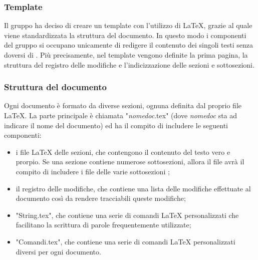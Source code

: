 \subsubsection{Template}
Il gruppo ha deciso di creare un template con l'utilizzo di \LaTeX{}, grazie al quale viene standardizzata la struttura del documento. In questo modo i componenti del gruppo si occupano unicamente di redigere il contenuto dei singoli testi senza doversi di  . Più precisamente, nel template vengono definite la prima pagina, la struttura del registro delle modifiche e l'indicizzazione delle sezioni e sottosezioni.

\subsubsection{Struttura del documento}
Ogni documento è formato da diverse sezioni, ognuna definita dal proprio file \LaTeX. La parte principale è chiamata "\textit{nomedoc}.tex" (dove \textit{nomedoc} sta ad indicare il nome del documento) ed ha il compito di includere le seguenti componenti:
\begin{itemize}
	\item i file \LaTeX{} delle sezioni, che contengono il contenuto del testo vero e prorpio. Se una sezione contiene numerose sottosezioni, allora il file avrà il compito di includere i file delle varie sottosezioni ;
	
	\item il registro delle modifiche, che contiene una lista delle modifiche effettuate al documento così da rendere tracciabili queste modifiche;
	
	\item "String.tex", che contiene una serie di comandi \LaTeX{} personalizzati che facilitano la scrittura di parole frequentemente utilizzate;
	
	\item "Comandi.tex", che contiene una serie di comandi \LaTeX{} personalizzati diversi per ogni documento.
\end{itemize}

